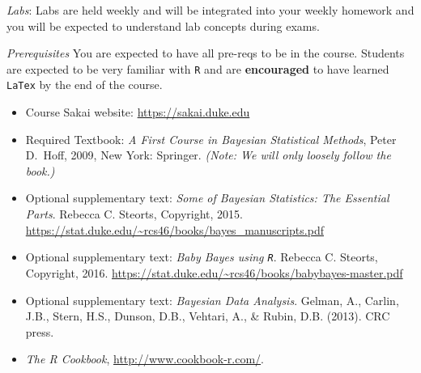 \documentclass[11pt]{article}
\begin{document}
\emph{Labs}: Labs are held weekly and will be integrated into your weekly homework and you will be expected to understand lab concepts during exams. 


\emph{Prerequisites} You are expected to have all pre-reqs to be in the course. Students are expected to be very familiar with \texttt{R} and are \textbf{encouraged} to have learned \texttt{LaTex} by the end of the course. 


\begin{itemize}
\item[] Course Sakai website: \url{https://sakai.duke.edu}
\item[] Required Textbook: \textit{A First Course in Bayesian Statistical Methods}, Peter D.\ Hoff, 2009, New York: Springer. \textit{(Note: We will only loosely follow the book.)}
\item[] Optional supplementary text:  \textit{Some of Bayesian Statistics: The Essential Parts}. Rebecca C. Steorts, Copyright, 2015. \url{https://stat.duke.edu/~rcs46/books/bayes_manuscripts.pdf}
\item[] Optional supplementary text:  \textit{Baby Bayes using \texttt{R}}. Rebecca C. Steorts, Copyright, 2016. 
\url{https://stat.duke.edu/~rcs46/books/babybayes-master.pdf}
\item[] Optional supplementary text:  \textit{Bayesian Data Analysis}. Gelman, A., Carlin, J.B., Stern, H.S., Dunson, D.B., Vehtari, A., \& Rubin, D.B. (2013). CRC press.
\item[] \emph{The R Cookbook}, \url{http://www.cookbook-r.com/}.
\end{itemize}

\end{document}
